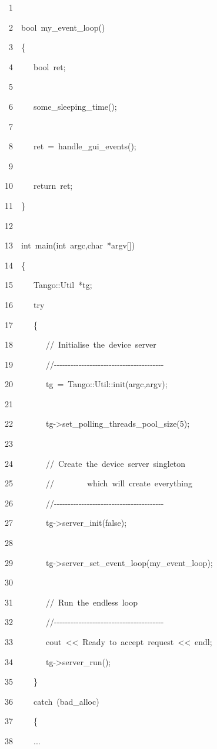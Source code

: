 
\begin{lyxcode}
~~~~~1~~

~~~~~2~~bool~my\_event\_loop()

~~~~~3~~\{

~~~~~4~~~~~bool~ret;

~~~~~5~~

~~~~~6~~~~~some\_sleeping\_time();

~~~~~7~~

~~~~~8~~~~~ret~=~handle\_gui\_events();

~~~~~9~~

~~~~10~~~~~return~ret;

~~~~11~~\}

~~~~12~~

~~~~13~~int~main(int~argc,char~{*}argv{[}{]})

~~~~14~~\{

~~~~15~~~~~Tango::Util~{*}tg;

~~~~16~~~~~try

~~~~17~~~~~\{

~~~~18~~~~~~~~//~Initialise~the~device~server

~~~~19~~~~~~~~//-{}-{}-{}-{}-{}-{}-{}-{}-{}-{}-{}-{}-{}-{}-{}-{}-{}-{}-{}-{}-{}-{}-{}-{}-{}-{}-{}-{}-{}-{}-{}-{}-{}-{}-{}-{}-{}-{}-{}-

~~~~20~~~~~~~~tg~=~Tango::Util::init(argc,argv);

~~~~21~~

~~~~22~~~~~~~~tg->set\_polling\_threads\_pool\_size(5);

~~~~23~~

~~~~24~~~~~~~~//~Create~the~device~server~singleton~

~~~~25~~~~~~~~//~~~~~~~~which~will~create~everything

~~~~26~~~~~~~~//-{}-{}-{}-{}-{}-{}-{}-{}-{}-{}-{}-{}-{}-{}-{}-{}-{}-{}-{}-{}-{}-{}-{}-{}-{}-{}-{}-{}-{}-{}-{}-{}-{}-{}-{}-{}-{}-{}-{}-

~~~~27~~~~~~~~tg->server\_init(false);

~~~~28~~

~~~~29~~~~~~~~tg->server\_set\_event\_loop(my\_event\_loop);

~~~~30~~

~~~~31~~~~~~~~//~Run~the~endless~loop

~~~~32~~~~~~~~//-{}-{}-{}-{}-{}-{}-{}-{}-{}-{}-{}-{}-{}-{}-{}-{}-{}-{}-{}-{}-{}-{}-{}-{}-{}-{}-{}-{}-{}-{}-{}-{}-{}-{}-{}-{}-{}-{}-{}-

~~~~33~~~~~~~~cout~<\textcompwordmark{}<~\textquotedbl{}Ready~to~accept~request\textquotedbl{}~<\textcompwordmark{}<~endl;

~~~~34~~~~~~~~tg->server\_run();

~~~~35~~~~~\}

~~~~36~~~~~catch~(bad\_alloc)

~~~~37~~~~~\{

~~~~38~~~~~...
\end{lyxcode}


